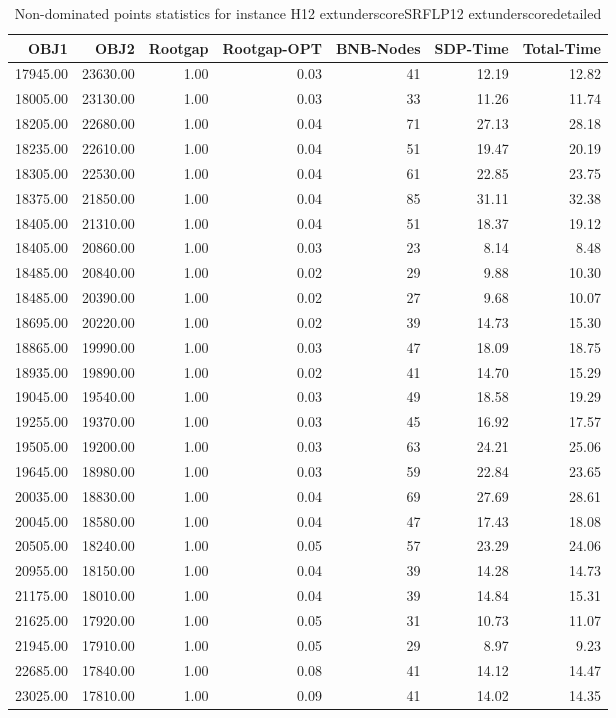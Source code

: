 \begin{table}
\caption{Non-dominated points statistics for instance H12	extunderscoreSRFLP12	extunderscoredetailed}
\label{tab:stats/H12_SRFLP12_detailed}
\begin{tabular}{rrrrrrr}
\toprule
OBJ1 & OBJ2 & Rootgap & Rootgap-OPT & BNB-Nodes & SDP-Time & Total-Time \\
\midrule
17945.00 & 23630.00 & 1.00 & 0.03 & 41 & 12.19 & 12.82 \\
18005.00 & 23130.00 & 1.00 & 0.03 & 33 & 11.26 & 11.74 \\
18205.00 & 22680.00 & 1.00 & 0.04 & 71 & 27.13 & 28.18 \\
18235.00 & 22610.00 & 1.00 & 0.04 & 51 & 19.47 & 20.19 \\
18305.00 & 22530.00 & 1.00 & 0.04 & 61 & 22.85 & 23.75 \\
18375.00 & 21850.00 & 1.00 & 0.04 & 85 & 31.11 & 32.38 \\
18405.00 & 21310.00 & 1.00 & 0.04 & 51 & 18.37 & 19.12 \\
18405.00 & 20860.00 & 1.00 & 0.03 & 23 & 8.14 & 8.48 \\
18485.00 & 20840.00 & 1.00 & 0.02 & 29 & 9.88 & 10.30 \\
18485.00 & 20390.00 & 1.00 & 0.02 & 27 & 9.68 & 10.07 \\
18695.00 & 20220.00 & 1.00 & 0.02 & 39 & 14.73 & 15.30 \\
18865.00 & 19990.00 & 1.00 & 0.03 & 47 & 18.09 & 18.75 \\
18935.00 & 19890.00 & 1.00 & 0.02 & 41 & 14.70 & 15.29 \\
19045.00 & 19540.00 & 1.00 & 0.03 & 49 & 18.58 & 19.29 \\
19255.00 & 19370.00 & 1.00 & 0.03 & 45 & 16.92 & 17.57 \\
19505.00 & 19200.00 & 1.00 & 0.03 & 63 & 24.21 & 25.06 \\
19645.00 & 18980.00 & 1.00 & 0.03 & 59 & 22.84 & 23.65 \\
20035.00 & 18830.00 & 1.00 & 0.04 & 69 & 27.69 & 28.61 \\
20045.00 & 18580.00 & 1.00 & 0.04 & 47 & 17.43 & 18.08 \\
20505.00 & 18240.00 & 1.00 & 0.05 & 57 & 23.29 & 24.06 \\
20955.00 & 18150.00 & 1.00 & 0.04 & 39 & 14.28 & 14.73 \\
21175.00 & 18010.00 & 1.00 & 0.04 & 39 & 14.84 & 15.31 \\
21625.00 & 17920.00 & 1.00 & 0.05 & 31 & 10.73 & 11.07 \\
21945.00 & 17910.00 & 1.00 & 0.05 & 29 & 8.97 & 9.23 \\
22685.00 & 17840.00 & 1.00 & 0.08 & 41 & 14.12 & 14.47 \\
23025.00 & 17810.00 & 1.00 & 0.09 & 41 & 14.02 & 14.35 \\
\bottomrule
\end{tabular}
\end{table}
